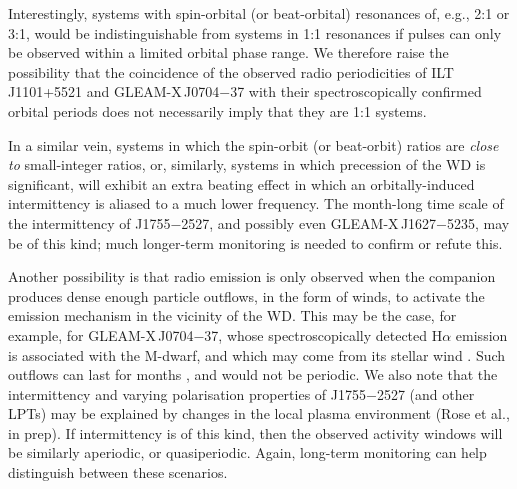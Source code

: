 \documentclass[fleqn,usenatbib]{mnras}
\newcommand{\src}{J1755$-$2527}
\begin{document}
Interestingly, systems with spin-orbital (or beat-orbital) resonances of, e.g., 2:1 or 3:1, would be indistinguishable from systems in 1:1 resonances if pulses can only be observed within a limited orbital phase range.
We therefore raise the possibility that the coincidence of the observed radio periodicities of ILT\,J1101+5521 and GLEAM-X\,J0704$-$37 with their spectroscopically confirmed orbital periods does not necessarily imply that they are 1:1 systems.

In a similar vein, systems in which the spin-orbit (or beat-orbit) ratios are \emph{close to} small-integer ratios, or, similarly, systems in which precession of the WD is significant, will exhibit an extra beating effect in which an orbitally-induced intermittency is aliased to a much lower frequency.
The month-long time scale of the intermittency of \src{}, and possibly even GLEAM-X\,J1627$-$5235, may be of this kind; much longer-term monitoring is needed to confirm or refute this.

Another possibility is that radio emission is only observed when the companion produces dense enough particle outflows, in the form of winds, to activate the emission mechanism in the vicinity of the WD.
This may be the case, for example, for GLEAM-X\,J0704$-$37, whose spectroscopically detected H$\alpha$ emission is associated with the M-dwarf, and which may come from its stellar wind \citep{2025A&A...695L...8R}.
Such outflows can last for months \citep{2021ApJ...915...37W}, and would not be periodic.
We also note that the intermittency and varying polarisation properties of \src{} (and other LPTs) may be explained by changes in the local plasma environment (Rose et al., in prep).
If intermittency is of this kind, then the observed activity windows will be similarly aperiodic, or quasiperiodic.
Again, long-term monitoring can help distinguish between these scenarios.






\end{document}
